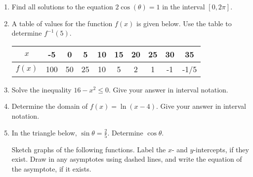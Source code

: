 \documentclass[12pt]{article}
\begin{document}
\begin{enumerate}
\item Find all solutions to the equation $2\cos (\theta) = 1$ in the interval $[0, 2 \pi].$\\


\quad \hfill \underline{\hspace{2in}}
\vfill


\item A table of values for the function $f(x)$ is given below. Use the table to determine $f^{-1}(5).$

\begin{tabular}{|c||c|c|c|c|c|c|c|c|c|}
$x$&-5&0&5&10&15&20&25&30&35\\
\hline
$f(x)$&100&50&25&10&5&2&1&-1&-1/5\\
\end{tabular}

\quad \hfill \underline{\hspace{2in}}
\vspace{.2in}

\item Solve the inequality $16-x^2\leq 0.$ Give your answer in interval notation.\\
\quad

\quad \hfill \underline{\hspace{2in}}
\vfill


\item Determine the domain of $f(x)=\ln(x-4).$ Give your answer in interval notation.\\
\quad

\quad \hfill \underline{\hspace{2in}}
\vfill


 \item In the triangle below, $\sin \theta = \frac{2}{5}.$ Determine $\cos \theta.$ \\ 
 
 \hfill \underline{\hspace{2in}}
\newpage
Sketch graphs of the following functions. Label the $x$- and $y$-intercepts, if they exist. Draw in any asymptotes using dashed lines, and write the equation of the asymptote, if it exists.
\begin{multicols}{2}{
      \vspace*{-0.45in}

}
\end{multicols}
\end{enumerate}
\end{document}
